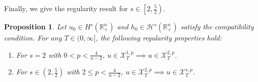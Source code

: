 \documentclass[preprint,compress,12pt]{elsarticle}
\newtheorem{proposition}[theorem]{Proposition}
\numberwithin{equation}{section}
\begin{document}
Finally, we give the regularity result for \(s \in \left[2, \frac{5}{2}\right)\).
\begin{proposition}\label{zealous2}
	Let $u_{0}\in H^{s}(\mathbb{R}^{n}_{+})$ and $h_{0}\in \mathcal{H}^{s}(\mathbb{R}_{+}^{n})$ satisfy the compatibility condition.  For any $T \in (0,\infty]$,  the following regularity properties hold:
	\begin{enumerate}[label=(\roman*)]
		\item For $s=2$ with $0 < p < \frac{4}{n-2}$, $u \in \mathscr{X}^{1,p}_T\implies u \in \mathscr{X}^{2,p}_T$.
		\item For $s \in \left(2,\frac{5}{2}\right)$ with $2 \leq p < \frac{4}{n-2}$, $u \in \mathscr{X}^{2,p}_T \implies u \in \mathscr{X}^{s,p}_T$.
	\end{enumerate}
\end{proposition}
\end{document}
